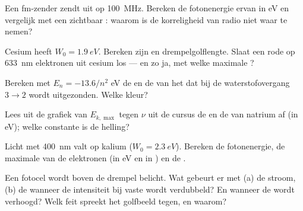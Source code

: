 \begin{exercise}[$\star$]\label{exo:g12:quantum-world:2}
Een fm-zender zendt uit op \qty{100}{MHz}. Bereken de fotonenergie ervan in
\unit{eV} en vergelijk met een zichtbaar : waarom is de korreligheid van
radio niet waar te nemen?
\end{exercise}

\begin{exercise}[$\star$]\label{exo:g12:quantum-world:3}
Cesium heeft $W_0 = \qty{1.9}{eV}$. Bereken zijn  en
drempelgolflengte. Slaat een rode  op \qty{633}{nm} elektronen uit
cesium los --- en zo ja, met welke maximale ?
\end{exercise}

\begin{exercise}[$\star$]\label{exo:g12:quantum-world:4}
Bereken met $E_n = -13.6/n^2$ \unit{eV} de  en de  van het
 dat bij de waterstofovergang $3 \to 2$ wordt uitgezonden. Welke kleur?
\end{exercise}

\begin{exercise}[$\star$]\label{exo:g12:quantum-world:5}
Lees uit de grafiek van $E_{k,\max}$ tegen $\nu$ uit de cursus de
 en de  van natrium af (in \unit{eV}); welke
constante is de helling?
\end{exercise}

\begin{exercise}[$\star\star$]\label{exo:g12:quantum-world:6}
Licht met  \qty{400}{nm} valt op kalium ($W_0 = \qty{2.3}{eV}$).
Bereken de fotonenergie, de maximale  van de elektronen (in
\unit{eV} en in ) en de .
\end{exercise}

\begin{exercise}[$\star\star$]\label{exo:g12:quantum-world:7}
Een fotocel wordt boven de drempel belicht. Wat gebeurt er met (a) de stroom,
(b) de  wanneer de intensiteit bij vaste  wordt
verdubbeld? En wanneer de  wordt verhoogd? Welk feit spreekt het
golfbeeld tegen, en waarom?
\end{exercise}

